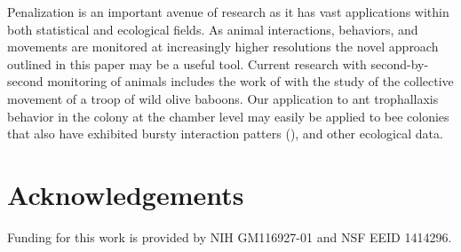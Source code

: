 \documentclass[cmbright,fleqn,referee]{envauth}
\begin{document}
Penalization is an important avenue of research as it has vast applications within both statistical and ecological fields. As animal interactions, behaviors, and movements are monitored at increasingly higher resolutions the novel approach outlined in this paper may be a useful tool. Current research with second-by-second monitoring of animals includes the work of \cite{Farine2016} with the study of the collective movement of a troop of wild olive baboons. Our application to ant trophallaxis behavior in the colony at the chamber level may easily be applied to bee colonies that also have exhibited bursty interaction patters (\cite{Gernat2017}), and other ecological data. 



\section*{Acknowledgements}
Funding for this work is provided by NIH GM116927-01 and NSF EEID 1414296. 










\end{document}
